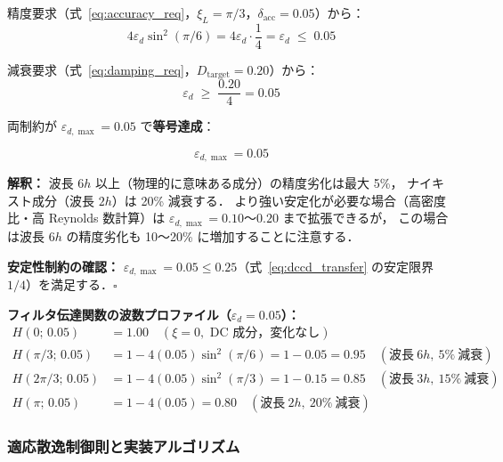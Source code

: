 \begin{tcolorbox}[resultbox, title={$\varepsilon_{d,\max}$ の設計値と設計根拠}]
\label{box:eps_design}
精度要求（式~\eqref{eq:accuracy_req}，$\xi_L = \pi/3$，$\delta_\mathrm{acc}=0.05$）から：
\begin{equation}
  4\varepsilon_d\sin^2(\pi/6) = 4\varepsilon_d\cdot\frac{1}{4} = \varepsilon_d \;\leq\; 0.05
  \label{eq:eps_bound_accuracy}
\end{equation}

減衰要求（式~\eqref{eq:damping_req}，$D_\mathrm{target}=0.20$）から：
\begin{equation}
  \varepsilon_d \;\geq\; \frac{0.20}{4} = 0.05
  \label{eq:eps_bound_damping}
\end{equation}

両制約が $\varepsilon_{d,\max} = 0.05$ で\textbf{等号達成}：

\begin{equation}
  \boxed{\varepsilon_{d,\max} = 0.05}
  \label{eq:eps_max}
\end{equation}

\textbf{解釈：}
波長 $6h$ 以上（物理的に意味ある成分）の精度劣化は最大 5\%，
ナイキスト成分（波長 $2h$）は 20\% 減衰する．
より強い安定化が必要な場合（高密度比・高 Reynolds 数計算）は
$\varepsilon_{d,\max} = 0.10$〜$0.20$ まで拡張できるが，
この場合は波長 $6h$ の精度劣化も 10〜20\% に増加することに注意する．

\medskip
\textbf{安定性制約の確認：}
$\varepsilon_{d,\max} = 0.05 \leq 0.25$（式~\eqref{eq:dccd_transfer} の安定限界 $1/4$）を満足する．$\square$
\end{tcolorbox}

\noindent\textbf{フィルタ伝達関数の波数プロファイル（$\varepsilon_d = 0.05$）：}
\begin{align*}
  H(0;\, 0.05)     &= 1.00 \quad (\xi = 0,\text{ DC 成分，変化なし}) \\
  H(\pi/3;\, 0.05) &= 1 - 4(0.05)\sin^2(\pi/6) = 1 - 0.05 = 0.95 \quad (\text{波長}\ 6h,\ 5\%\ \text{減衰}) \\
  H(2\pi/3;\, 0.05)&= 1 - 4(0.05)\sin^2(\pi/3) = 1 - 0.15 = 0.85 \quad (\text{波長}\ 3h,\ 15\%\ \text{減衰}) \\
  H(\pi;\, 0.05)   &= 1 - 4(0.05) = 0.80 \quad (\text{波長}\ 2h,\ 20\%\ \text{減衰})
\end{align*}

\subsubsection{適応散逸制御則と実装アルゴリズム}
\label{sec:dccd_adaptive}

